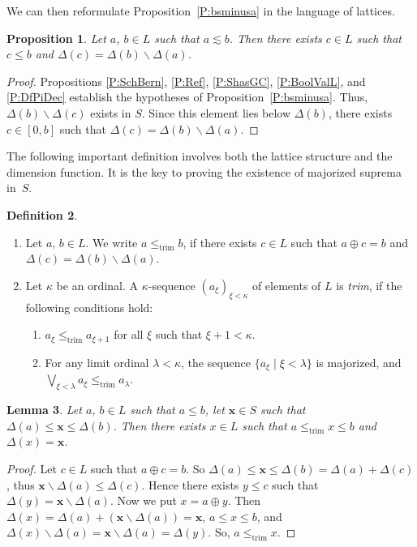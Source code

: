 \documentclass[psamsfonts,reqno]{memo-l}
\theoremstyle{plain}
\newtheorem{lemma}{Lemma}[section]
\newtheorem{proposition}[lemma]{Proposition}
\theoremstyle{definition}
\newtheorem{definition}[lemma]{Definition}
\theoremstyle{remark}
\numberwithin{equation}{section}
\newcommand{\trim}{\leq_{\mathrm{trim}}}
\newcommand{\sd}{\smallsetminus}
\newcommand{\lx}{\boldsymbol{x}}
\newcommand{\DD}{\Delta}
\newcommand{\set}[1]{\{#1\}}
\newcommand{\setm}[2]{\set{#1\mid#2}}
\newcommand{\famm}[2]{(#1)_{#2}}
\begin{document}
We can then reformulate Proposition~\ref{P:bsminusa} in the language of
lattices.

\begin{proposition}\label{P:bsminusaL}
Let $a$, $b\in L$ such that $a\lesssim b$. Then there exists $c\in L$ such
that $c\leq b$ and $\DD(c)=\DD(b)\sd\DD(a)$.
\end{proposition}

\begin{proof}
Propositions \ref{P:SchBern}, \ref{P:Ref}, \ref{P:ShasGC},
\ref{P:BoolValL}, and \ref{P:DfPiDec} establish the hypotheses of
Proposition~\ref{P:bsminusa}. Thus, $\DD(b)\sd\DD(c)$ exists in $S$. Since
this element lies below $\DD(b)$, there exists $c\in[0,b]$ such that
$\DD(c)=\DD(b)\sd\DD(a)$.
\end{proof}

The following important definition involves both the lattice structure and
the dimension function. It is the key to proving the existence of majorized
suprema in~$S$.

\begin{definition}\label{D:trim}\hfill
\begin{enumerate}
\item Let $a$, $b\in L$. We write\index{abbtzzrim@$a\trim b$|ii}
$a\trim b$, if there exists $c\in L$ such
that $a\oplus c=b$ and $\DD(c)=\DD(b)\sd\DD(a)$.

\item Let $\kappa$ be an ordinal. A $\kappa$-sequence
$\famm{a_\xi}{\xi<\kappa}$ of elements of $L$ is \emph{trim},
 if the following conditions hold:
\begin{enumerate}
\item $a_\xi\trim a_{\xi+1}$ for all $\xi$ such that $\xi+1<\kappa$.

\item For any limit ordinal $\lambda<\kappa$,
the sequence $\setm{a_\xi}{\xi<\lambda}$ is majorized, and
$\bigvee_{\xi<\lambda}a_\xi\trim a_\lambda$.
\end{enumerate}
\end{enumerate}
\end{definition}

\begin{lemma}\label{L:TrimIns}
Let $a$, $b\in L$ such that $a\leq b$, let $\lx\in S$ such that
$\DD(a)\leq\lx\leq\DD(b)$. Then there exists $x\in L$ such that
$a\trim x\leq b$ and $\DD(x)=\lx$.
\end{lemma}

\begin{proof}
Let $c\in L$ such that $a\oplus c=b$. So
$\DD(a)\leq\lx\leq\DD(b)=\DD(a)+\DD(c)$, thus $\lx\sd\DD(a)\leq\DD(c)$.
Hence there exists $y\leq c$ such that
$\DD(y)=\lx\sd\DD(a)$. Now we put $x=a\oplus y$. Then
$\DD(x)=\DD(a)+(\lx\sd\DD(a))=\lx$, $a\leq x\leq b$, and
$\DD(x)\sd\DD(a)=\lx\sd\DD(a)=\DD(y)$. So, $a\trim x$.
\end{proof}
\end{document}
